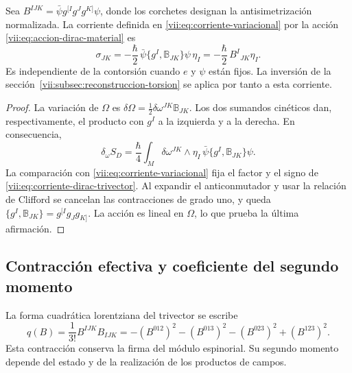 \begin{proposition}
\label{vii:prop:corriente-dirac-explicita}
Sea
\(B^{IJK}=\bar\psi g^{[I}g^Jg^{K]}\psi\), donde los corchetes
designan la antisimetrización normalizada. La corriente definida en
\eqref{vii:eq:corriente-variacional} por la acción
\eqref{vii:eq:accion-dirac-material} es
\begin{equation}
 \sigma_{JK}
 =-\frac{\hbar}{2}\,
   \bar\psi\{g^I,\mathbb B_{JK}\}\psi\,\eta_I
 =-\frac{\hbar}{2}\,B^I{}_{JK}\eta_I.
 \label{vii:eq:corriente-dirac-trivector}
\end{equation}
Es independiente de la contorsión cuando \(e\) y \(\psi\) están
fijos. La inversión de la sección~\ref{vii:subsec:reconstruccion-torsion}
se aplica por tanto a esta corriente.
\end{proposition}
\begin{proof}
La variación de \(\Omega\) es
\(\delta\Omega=\frac12\delta\omega^{JK}\mathbb B_{JK}\).
Los dos sumandos cinéticos dan, respectivamente, el producto con
\(g^I\) a la izquierda y a la derecha. En consecuencia,
\[
 \delta_\omega S_D
 =\frac{\hbar}{4}\int_M\delta\omega^{JK}\wedge\eta_I\,
                 \bar\psi\{g^I,\mathbb B_{JK}\}\psi.
\]
La comparación con \eqref{vii:eq:corriente-variacional} fija el
factor y el signo de \eqref{vii:eq:corriente-dirac-trivector}.
Al expandir el anticonmutador y usar la relación de Clifford se
cancelan las contracciones de grado uno, y queda
\(\{g^I,\mathbb B_{JK}\}=g^{[I}g_Jg_{K]}\).
La acción es lineal en \(\Omega\), lo que prueba la última
afirmación.
\end{proof}

\subsection{Contracción efectiva y coeficiente del segundo momento}
\label{vii:subsec:contraccion-espinorial}

La forma cuadrática lorentziana del trivector se escribe
\begin{equation}
 q(B)=\frac1{3!}B^{IJK}B_{IJK}
 =-(B^{012})^2-(B^{013})^2-(B^{023})^2+(B^{123})^2.
 \label{vii:eq:cuadratica-trivector}
\end{equation}
Esta contracción conserva la firma del módulo espinorial. Su segundo
momento depende del estado y de la realización de los productos de
campos.

